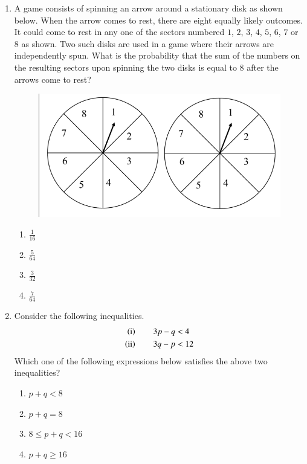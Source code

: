 \documentclass[journal]{IEEEtran}
\begin{document}
\begin{enumerate}[start=1]
\item A game consists of spinning an arrow around a stationary disk as shown below. When the arrow comes to rest, there are eight equally likely outcomes. It could come to rest in any one of the sectors numbered $1$, $2$, $3$, $4$, $5$, $6$, $7$ or $8$ as shown. Two such disks are used in a game where their arrows are independently spun. What is the probability that the sum of the numbers on the resulting sectors upon spinning the two disks is equal to $8$ after the arrows come to rest?

\hfill{}
\begin{figure}[H]
\centering
\includegraphics[width = 0.5\columnwidth]{figs/02.png}
\caption*{}
\label{fig:q7}
\end{figure}
\begin{enumerate}
\item $\frac{1}{16}$
\vspace{0.3cm}
\item $\frac{5}{64}$
\vspace{0.3cm}
\item $\frac{3}{32}$
\vspace{0.3cm}
\item $\frac{7}{64}$
\end{enumerate}

\item Consider the following inequalities.
\begin{align*}
\left(\text{i}\right) \qquad 3p-q&<4\\
\left(\text{ii}\right)\qquad 3q-p&<12
\end{align*}
Which one of the following expressions below satisfies the above two inequalities?

\hfill{}
\begin{enumerate}
\item $p+q<8$
\item $p+q=8$
\item $8\le p+q<16$
\item $p+q\ge16$
\end{enumerate}


\end{enumerate}
\end{document}
